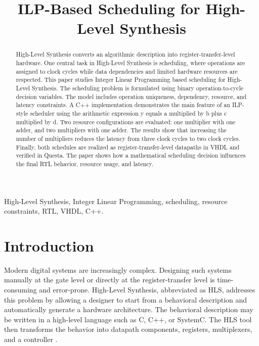 \documentclass[conference]{IEEEtran}
\title{ILP-Based Scheduling for High-Level Synthesis}
\author{
	\IEEEauthorblockN{Md Rafiul Islam}
	\IEEEauthorblockA{
		ID: 1232714\\
		Hamm-Lippstadt University of Applied Sciences\\
		HW/SW Codesign Seminar Paper\\
		Email: md.rafiul-islam@stud.hshl.de
	}
}
\begin{document}
	\sloppy
	\maketitle
	
	\begin{abstract}
		High-Level Synthesis converts an algorithmic description into register-transfer-level hardware. One central task in High-Level Synthesis is scheduling, where operations are assigned to clock cycles while data dependencies and limited hardware resources are respected. This paper studies Integer Linear Programming based scheduling for High-Level Synthesis. The scheduling problem is formulated using binary operation-to-cycle decision variables. The model includes operation uniqueness, dependency, resource, and latency constraints. A C++ implementation demonstrates the main feature of an ILP-style scheduler using the arithmetic expression y equals a multiplied by b plus c multiplied by d. Two resource configurations are evaluated: one multiplier with one adder, and two multipliers with one adder. The results show that increasing the number of multipliers reduces the latency from three clock cycles to two clock cycles. Finally, both schedules are realized as register-transfer-level datapaths in VHDL and verified in Questa. The paper shows how a mathematical scheduling decision influences the final RTL behavior, resource usage, and latency.
	\end{abstract}
	
	\begin{IEEEkeywords}
		High-Level Synthesis, Integer Linear Programming, scheduling, resource constraints, RTL, VHDL, C++.
	\end{IEEEkeywords}
	
	\section{Introduction}
	
	Modern digital systems are increasingly complex. Designing such systems manually at the gate level or directly at the register-transfer level is time-consuming and error-prone. High-Level Synthesis, abbreviated as HLS, addresses this problem by allowing a designer to start from a behavioral description and automatically generate a hardware architecture. The behavioral description may be written in a high-level language such as C, C++, or SystemC. The HLS tool then transforms the behavior into datapath components, registers, multiplexers, and a controller \cite{demicheli,cong,mcfarland}.
	
\end{document}
